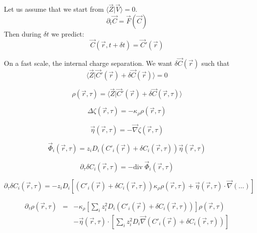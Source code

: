 \documentclass[aps,12pt]{revtex4}
\begin{document}
Let us assume that we start from $\langle \vec Z \vert \vec V \rangle = 0$.
\begin{equation}
	\partial_t \vec C = \vec F ( \vec C )
\end{equation}
Then during $\delta t$ we predict:
\begin{equation}
	\vec C (\vec r, t+\delta t) = \vec C ' (\vec r)
\end{equation}

On a fast scale, the internal charge separation.
We want $\delta \vec C(\vec r)$ such that
\begin{equation}
	\langle \vec Z \vert \vec C' (\vec r) + \delta \vec C(\vec r) \rangle = 0
\end{equation}

\begin{equation}
	\rho(\vec r,\tau) = \langle \vec Z \vert \vec C' (\vec r) + \delta \vec C(\vec r,\tau) \rangle
\end{equation}

\begin{equation}
	\Delta \zeta(\vec r, \tau) = - \kappa_\rho \rho(\vec r,\tau)
\end{equation}

\begin{equation}
	\vec \eta(\vec r, \tau) = - \vec \nabla \zeta(\vec r,\tau)
\end{equation}

\begin{equation}
	\vec \Phi_i(\vec r,\tau) = z_i D_i \left(   C'_i (\vec r) + \delta  C_i(\vec r,\tau) \right) \vec \eta(\vec r, \tau)
\end{equation}

\begin{equation}
	\partial_\tau \delta   C_i(\vec r, \tau) = - \mathrm{div} \; \vec \Phi_i (\vec r,\tau)
\end{equation}


\begin{equation}
	\partial_\tau \delta   C_i(\vec r, \tau) 
	= - z_i D_i 
	\left[
	\left( C'_i (\vec r) + \delta  C_i(\vec r,\tau) \right) \kappa_\rho \rho(\vec r,\tau)
	+ \vec \eta(\vec r,\tau) \cdot \vec \nabla \left( \ldots \right)
	\right]
\end{equation}

\begin{equation}
\begin{array}{rcl}
	\partial_\tau   \rho(\vec r, \tau) &
	= & - \kappa_\rho \left[ \sum_i z_i^2 D_i \left( C'_i (\vec r) + \delta  C_i(\vec r,\tau) \right) \right]   \rho(\vec r,\tau) \\
	 & & - \vec \eta(\vec r,\tau) \cdot \left[\sum_i z_i^2 D_i \vec\nabla \left( C'_i (\vec r) + \delta  C_i(\vec r,\tau) \right) \right]\\
\end{array}
\end{equation}
\end{document}

